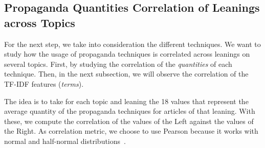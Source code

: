 \subsection{\statusgreen Propaganda Quantities Correlation of Leanings across Topics}
\label{ssec:topic_propaganda_leaning_tech_quantities}




For the next step, we take into consideration the different techniques. We want to study how the usage of propaganda techniques is correlated across leanings on several topics.
%
First, by studying the correlation of the \emph{quantities} of each technique. Then, in the next subsection, we will observe the correlation of the TF-IDF features (\emph{terms}).

The idea is to take for each topic and leaning the 18 values that represent the average quantity of the propaganda techniques for articles of that leaning. With these, we compute the correlation of the values of the Left against the values of the Right.
%
As correlation metric, we choose to use Pearson because it works with normal and half-normal distributions~\cite{pearson1931analysis}.

